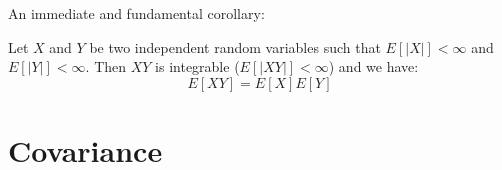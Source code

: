 An immediate and fundamental corollary:%
\begin{theorem}[Corollary]
Let $X$ and $Y$ be two independent random variables such that $E[|X|] < \infty$ and $E[|Y|] < \infty$. Then $XY$ is integrable ($E[|XY|] < \infty$) and we have:
\[ E[XY] = E[X]E[Y] \]
\end{theorem}%
\section{Covariance}%

